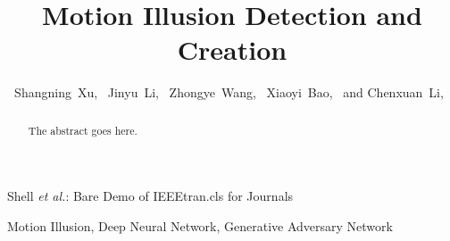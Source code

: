 \documentclass[journal]{IEEEtran}
\begin{document}
%
\title{Motion Illusion Detection and Creation}
%
%
%

\author{
	Shangning~Xu,~
	Jinyu~Li,~
	Zhongye~Wang,~
	Xiaoyi~Bao,~
	and Chenxuan~Li,~
}

%
{Shell \MakeLowercase{\textit{et al.}}: Bare Demo of IEEEtran.cls for Journals}
%


\maketitle

\begin{abstract}
The abstract goes here.
\end{abstract}

\begin{IEEEkeywords}
Motion Illusion, Deep Neural Network, Generative Adversary Network
\end{IEEEkeywords}


\IEEEpeerreviewmaketitle
\end{document}
